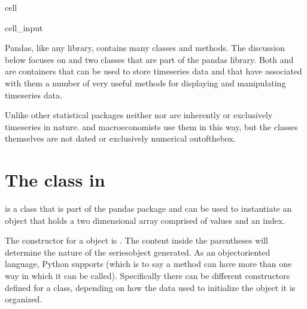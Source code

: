 \documentclass[letterpaper,10pt,english]{jupyterBook}
\begin{document}
\begin{sphinxuseclass}{cell}\begin{sphinxVerbatimInput}

\begin{sphinxuseclass}{cell_input}
\begin{sphinxVerbatim}[commandchars=\\\{\}]
    
\end{sphinxVerbatim}

\end{sphinxuseclass}\end{sphinxVerbatimInput}

\end{sphinxuseclass}
\sphinxAtStartPar
Pandas, like any library, contains many classes and methods.  The discussion below focuses on  and  two classes that are part of the pandas library.  Both  and  are containers that can be used to store time\sphinxhyphen{}series data and that have associated with them a number of very useful methods for displaying and manipulating time\sphinxhyphen{}series data.

\sphinxAtStartPar
Unlike other statistical packages neither  nor  are inherently or exclusively time\sphinxhyphen{}series in nature.  and macro\sphinxhyphen{}economists use them in this way, but the classes themselves are not dated or exclusively numerical out\sphinxhyphen{}of\sphinxhyphen{}the\sphinxhyphen{}box.


\section{The  class in }
\label{\detokenize{content/04_PythonEssentials/PythonPandasDataframes:the-series-class-in-pandas}}
\sphinxAtStartPar
{} is a class that is part of the pandas package and can be used to instantiate an object that holds a two dimensional array comprised of values and an index.

\sphinxAtStartPar
The constructor for a  object is .  The content inside the parentheses will determine the nature of the series\sphinxhyphen{}object generated.  As an object\sphinxhyphen{}oriented language, Python supports  (which is to say a method can have more than one way in which it can be called). Specifically there can be different constructors defined for a class, depending on how the data used to initialize the object it is organized.
\end{document}
